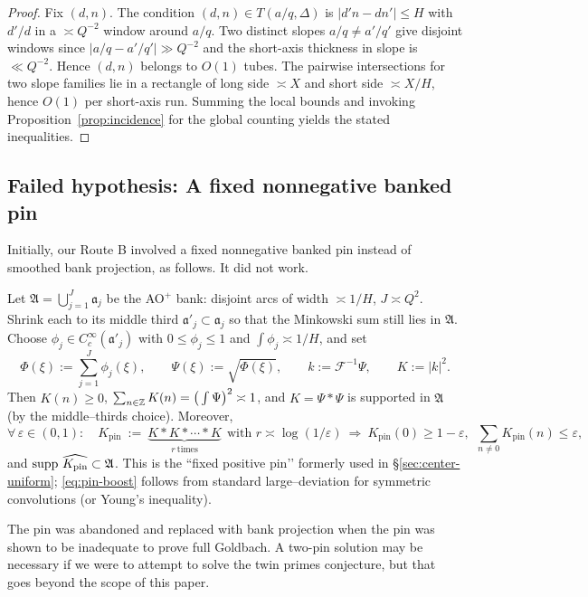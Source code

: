 \begin{proof}
Fix $(d,n)$. The condition $(d,n)\in T(a/q,\Delta)$ is $|d'n-dn'|\le H$ with $d'/d$ in a $\asymp Q^{-2}$ window around $a/q$. Two distinct slopes $a/q\ne a'/q'$ give disjoint windows since $|a/q-a'/q'|\gg Q^{-2}$ and the short-axis thickness in slope is $\ll Q^{-2}$. Hence $(d,n)$ belongs to $O(1)$ tubes. The pairwise intersections for two slope families lie in a rectangle of long side $\asymp X$ and short side $\asymp X/H$, hence $O(1)$ per short-axis run. Summing the local bounds and invoking Proposition~\ref{prop:incidence} for the global counting yields the stated inequalities.
\end{proof}

\subsection*{Failed hypothesis: A fixed nonnegative banked pin}\label{subsec:fixed-pin}

Initially, our Route B involved a fixed nonnegative banked pin instead of smoothed bank projection, as follows. It did not work.

Let $\mathfrak A=\bigcup_{j=1}^{J}\mathfrak a_j$ be the AO$^+$ bank: disjoint arcs of width $\asymp 1/H$, $J\asymp Q^2$.
Shrink each to its middle third $\mathfrak a'_j\subset\mathfrak a_j$ so that the Minkowski sum still lies in $\mathfrak A$.
Choose $\phi_j\in C_c^\infty(\mathfrak a'_j)$ with $0\le\phi_j\le 1$ and $\int \phi_j\asymp 1/H$, and set
\[
  \Phi(\xi):=\sum_{j=1}^J \phi_j(\xi),\qquad \Psi(\xi):=\sqrt{\Phi(\xi)},\qquad
  k:=\mathcal F^{-1}\Psi,\qquad K:=|k|^2.
\]
Then $K(n)\ge 0$, $\sum_{n\in\mathbb{Z}} K(n)=\big(\int\Psi\big)^2\asymp 1$, and $\widehat K=\Psi\ast\Psi$ is supported in $\mathfrak A$ (by the middle–thirds choice). Moreover,
\begin{equation}\label{eq:pin-boost}
  \forall\,\varepsilon\in(0,1):\quad
  K_{\mathrm{pin}}\ :=\ \underbrace{K*K*\cdots*K}_{r\ \text{times}}\ \ \text{with } r\asymp \log(1/\varepsilon)
  \ \Rightarrow\ 
  K_{\mathrm{pin}}(0)\ge 1-\varepsilon,\ \ \sum_{n\neq 0}K_{\mathrm{pin}}(n)\le \varepsilon,
\end{equation}
and $\operatorname{supp}\,\widehat{K_{\mathrm{pin}}}\subset \mathfrak A$.
This is the “fixed positive pin’’ formerly used in §\ref{sec:center-uniform}; \eqref{eq:pin-boost} follows from standard large–deviation for symmetric convolutions (or Young’s inequality).

The pin was abandoned and replaced with bank projection when the pin was shown to be inadequate to prove full Goldbach. A two-pin solution may be necessary if we were to attempt to solve the twin primes conjecture, but that goes beyond the scope of this paper.

